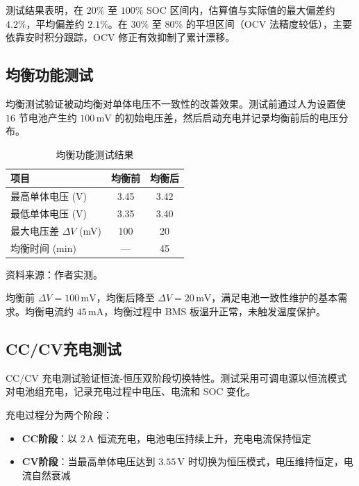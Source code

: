 测试结果表明，在 $20\%$ 至 $100\%$ SOC 区间内，估算值与实际值的最大偏差约 $4.2\%$，平均偏差约 $2.1\%$。在 $30\%$ 至 $80\%$ 的平坦区间（OCV 法精度较低），主要依靠安时积分跟踪，OCV 修正有效抑制了累计漂移。

\subsection{均衡功能测试}

均衡测试验证被动均衡对单体电压不一致性的改善效果。测试前通过人为设置使 $16$ 节电池产生约 $100\,\mathrm{mV}$ 的初始电压差，然后启动充电并记录均衡前后的电压分布。

\begin{table}[htbp]
  \centering
  \caption{均衡功能测试结果}
  \label{tab:balancing_test}
  \begin{tabular}{@{}lcc@{}}
    \toprule
    \textbf{项目} & \textbf{均衡前} & \textbf{均衡后} \\
    \midrule
    最高单体电压 (V)   & 3.45 & 3.42 \\
    最低单体电压 (V)   & 3.35 & 3.40 \\
    最大电压差 $\Delta V$ (mV) & 100  & 20 \\
    均衡时间 (min)     & ---  & 45 \\
    \bottomrule
  \end{tabular}
\end{table}
\vspace{-0.3em}
{\small 资料来源：作者实测。}

均衡前 $\Delta V=100\,\mathrm{mV}$，均衡后降至 $\Delta V=20\,\mathrm{mV}$，满足电池一致性维护的基本需求。均衡电流约 $45\,\mathrm{mA}$，均衡过程中 BMS 板温升正常，未触发温度保护。

\subsection{CC/CV充电测试}

CC/CV 充电测试验证恒流-恒压双阶段切换特性。测试采用可调电源以恒流模式对电池组充电，记录充电过程中电压、电流和 SOC 变化。

充电过程分为两个阶段：
\begin{itemize}[leftmargin=*,itemsep=0.3ex]
  \item \textbf{CC阶段}：以 $2\,\mathrm{A}$ 恒流充电，电池电压持续上升，充电电流保持恒定
  \item \textbf{CV阶段}：当最高单体电压达到 $3.55\,\mathrm{V}$ 时切换为恒压模式，电压维持恒定，电流自然衰减
\end{itemize}

